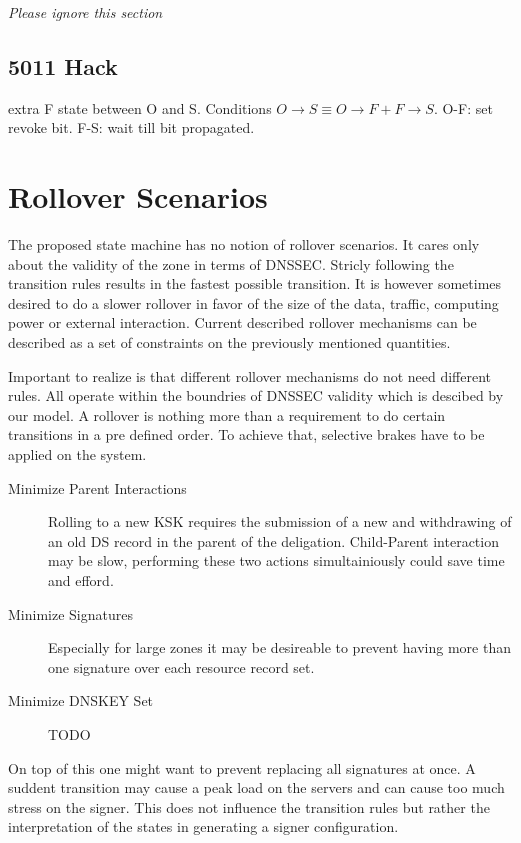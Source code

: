 \documentclass[twoside,english, a4paper]{article}
\begin{document}
\emph{Please ignore this section}
\subsection{5011 Hack}

extra F state between O and S. Conditions $O\rightarrow S \equiv O\rightarrow F + F\rightarrow S$.
O-F: set revoke bit. F-S: wait till bit propagated. 

\section{Rollover Scenarios}

The proposed state machine has no notion of rollover scenarios. It cares
only about the validity of the zone in terms of DNSSEC. Stricly following
the transition rules results in the fastest possible transition. It is
however sometimes desired to do a slower rollover in favor of the size 
of the data, traffic, computing power or external interaction. Current
described rollover mechanisms can be described as a set of constraints
on the previously mentioned quantities.

Important to realize is that different rollover mechanisms do not need
different rules. All operate within the boundries of DNSSEC validity
which is descibed by our model. A rollover is nothing more than a
requirement to do certain transitions in a pre defined order. To achieve
that, selective brakes have to be applied on the system.

\begin{description}
\item [Minimize Parent Interactions]
	Rolling to a new KSK requires the
	submission of a new and withdrawing of an old DS record in the parent of
	the deligation. Child-Parent interaction may be slow, performing
	these two actions simultainiously could save time and efford.
\item [Minimize Signatures]
	Especially for large zones it may be 
	desireable to prevent having more than one signature over each 
	resource record set.
\item [Minimize DNSKEY Set] TODO
\end{description}

On top of this one might want to prevent replacing all signatures at 
once. A suddent transition may cause a peak load on the servers and can
cause too much stress on the signer. This does not influence the 
transition rules but rather the interpretation of the states in generating
a signer configuration.
\end{document}
